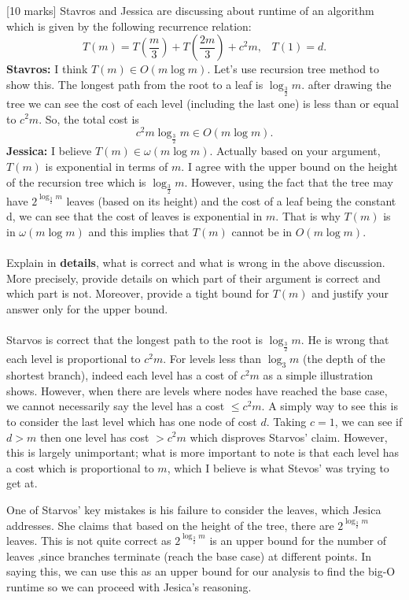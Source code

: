 {[10 marks]} Stavros and Jessica are discussing about runtime of an algorithm which is given
by the following recurrence relation:
$$T(m) = T\left(\frac{m}{3}\right) + T\left(\frac{2m}{3}\right) + c^2m, \;\;\; T(1)=d.$$
{\bf Stavros:} I think $T(m)\in O(m\log m)$. Let's use recursion tree method to show
this. The longest path from the root to a leaf is $\log_{\frac{3}{2}}m$. after drawing
the tree
we can see the cost of each level (including the last one) is less than or equal to $c^2m$. So, the total cost
is $$c^2m\log_{\frac{3}{2}}m \in O(m\log m).$$
{\bf Jessica:} I believe $T(m) \in \omega (m \log m)$. Actually based on your argument,
$T(m)$ is exponential in terms of $m$. I agree with the upper bound on the height of
the recursion tree which is $\log_{\frac{3}{2}}m$. However, using the fact that the tree
may have $2^{\log_{\frac{3}{2}}m}$ leaves (based on its height) and the cost of a leaf being the constant d,
we can see that the cost of leaves is exponential in $m$. That is why $T(m)$ is in
$\omega (m \log m)$ and this implies that $T(m)$ cannot be in $O(m \log m)$.
\\
\\
Explain in {\bf details}, what is correct and what is wrong in the above discussion.
More precisely, provide details on which part of their argument is correct and which
part is not. Moreover, provide a tight bound for $T(m)$ and justify your answer only
for the upper bound.
\\
\\

Starvos is correct that the longest path to the root is $\log_{\frac{3}{2}}{m}$. He is wrong that each level is proportional to $c^2 m$. For levels less than $\log_{3}{m}$ (the depth of the shortest branch), indeed each level has a cost of $c^2 m$ as a simple illustration shows. However, when there are levels where nodes have reached the base case, we cannot necessarily say the level has a cost $\le c^2 m$. A simply way to see this is to consider the last level which has one node of cost $d$. Taking $c = 1$, we can see if $d > m$ then one level has cost $> c^2 m$ which disproves Starvos' claim. However, this is largely unimportant; what is more important to note is that each level has a cost which is proportional to $m$, which I believe is what Stevos' was trying to get at.

One of Starvos' key mistakes is his failure to consider the leaves, which Jesica addresses. She claims that based on the height of the tree, there are $2^{\log_{\frac{3}{2}}{m}}$ leaves. This is not quite correct as $2^{\log_{\frac{3}{2}}{m}}$ is an upper bound for the number of leaves ,since branches terminate (reach the base case) at different points. In saying this, we can use this as an upper bound for our analysis to find the big-O runtime so we can proceed with Jesica's reasoning.


